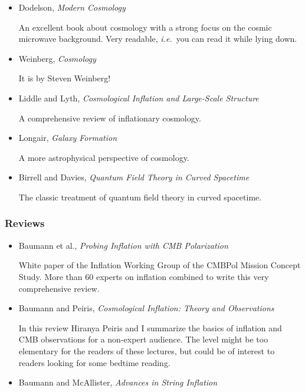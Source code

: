 \documentclass[12pt,letterpaper,rotate]{article}
\begin{document}
{\begin{itemize}
A nice treatment of early universe cosmology and the theory of cosmological perturbations.

\item Dodelson, {\it Modern Cosmology}

An excellent book about cosmology with a strong focus on the cosmic microwave background. Very readable, {\it i.e.}~you can read it while lying down.


\item Weinberg, {\it Cosmology}

It is by Steven Weinberg!

\item Liddle and Lyth, {\it Cosmological Inflation and Large-Scale Structure}

A comprehensive review of inflationary cosmology.

\item Longair, {\it Galaxy Formation}

A more astrophysical perspective of cosmology. 

\item Birrell and Davies, {\it Quantum Field Theory in Curved Spacetime}

The classic treatment of quantum field theory in curved spacetime.


\end{itemize}


\subsubsection*{Reviews}

\begin{itemize}
\item Baumann et al., {\it Probing Inflation with CMB Polarization}

White paper of the Inflation Working Group of the CMBPol Mission Concept Study.
More than 60 experts on inflation combined to write this very comprehensive review.

\item Baumann and Peiris, {\it Cosmological Inflation: Theory and Observations}

In this review Hiranya Peiris and I summarize the basics of inflation and CMB observations for a non-expert audience.  The level might be too elementary for the readers of these lectures, but could be of interest to readers looking for some bedtime reading.

\item Baumann and McAllister, {\it Advances in String Inflation}


\end{itemize}}
\end{document}
